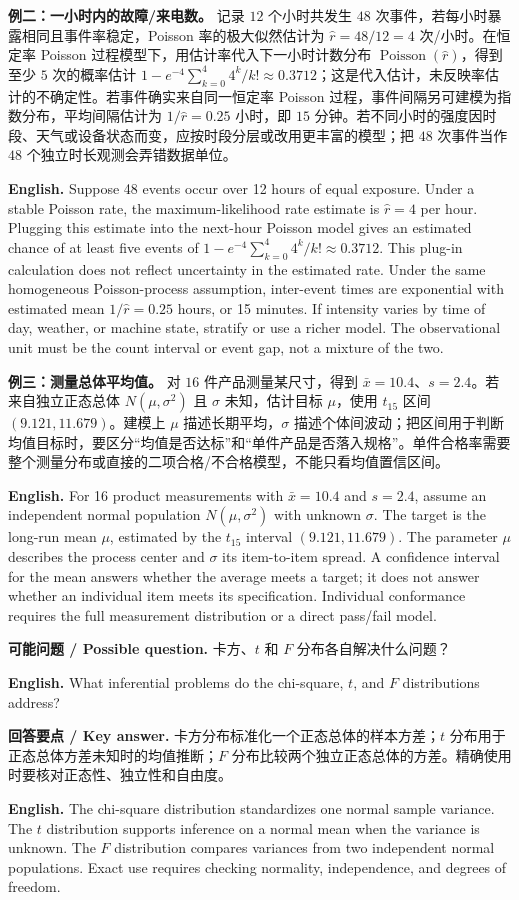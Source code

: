 \documentclass[UTF8,11pt,a4paper]{ctexart}
\newcommand{\EN}[1]{\par\noindent\textbf{English.} #1\par}
\newcommand{\ASK}[4]{\par\noindent\textbf{可能问题 / Possible question.} #1\par\EN{#2}\noindent\textbf{回答要点 / Key answer.} #3\par\EN{#4}\medskip}
\begin{document}
\noindent\textbf{例二：一小时内的故障/来电数。} 记录 $12$ 个小时共发生 $48$ 次事件，若每小时暴露相同且事件率稳定，Poisson 率的极大似然估计为 $\hat r=48/12=4$ 次/小时。在恒定率 Poisson 过程模型下，用估计率代入下一小时计数分布 $\operatorname{Poisson}(\hat r)$，得到至少 $5$ 次的概率估计 $1-e^{-4}\sum_{k=0}^4 4^k/k!\approx0.3712$；这是代入估计，未反映率估计的不确定性。若事件确实来自同一恒定率 Poisson 过程，事件间隔另可建模为指数分布，平均间隔估计为 $1/\hat r=0.25$ 小时，即 $15$ 分钟。若不同小时的强度因时段、天气或设备状态而变，应按时段分层或改用更丰富的模型；把 $48$ 次事件当作 $48$ 个独立时长观测会弄错数据单位。
\EN{Suppose 48 events occur over 12 hours of equal exposure. Under a stable Poisson rate, the maximum-likelihood rate estimate is $\hat r=4$ per hour. Plugging this estimate into the next-hour Poisson model gives an estimated chance of at least five events of $1-e^{-4}\sum_{k=0}^4 4^k/k!\approx0.3712$. This plug-in calculation does not reflect uncertainty in the estimated rate. Under the same homogeneous Poisson-process assumption, inter-event times are exponential with estimated mean $1/\hat r=0.25$ hours, or 15 minutes. If intensity varies by time of day, weather, or machine state, stratify or use a richer model. The observational unit must be the count interval or event gap, not a mixture of the two.}

\noindent\textbf{例三：测量总体平均值。} 对 $16$ 件产品测量某尺寸，得到 $\bar x=10.4$、$s=2.4$。若来自独立正态总体 $N(\mu,\sigma^2)$ 且 $\sigma$ 未知，估计目标 $\mu$，使用 $t_{15}$ 区间 $(9.121,11.679)$。建模上 $\mu$ 描述长期平均，$\sigma$ 描述个体间波动；把区间用于判断均值目标时，要区分“均值是否达标”和“单件产品是否落入规格”。单件合格率需要整个测量分布或直接的二项合格/不合格模型，不能只看均值置信区间。
\EN{For 16 product measurements with $\bar x=10.4$ and $s=2.4$, assume an independent normal population $N(\mu,\sigma^2)$ with unknown $\sigma$. The target is the long-run mean $\mu$, estimated by the $t_{15}$ interval $(9.121,11.679)$. The parameter $\mu$ describes the process center and $\sigma$ its item-to-item spread. A confidence interval for the mean answers whether the average meets a target; it does not answer whether an individual item meets its specification. Individual conformance requires the full measurement distribution or a direct pass/fail model.}

\ASK{卡方、$t$ 和 $F$ 分布各自解决什么问题？}{What inferential problems do the chi-square, $t$, and $F$ distributions address?}{卡方分布标准化一个正态总体的样本方差；$t$ 分布用于正态总体方差未知时的均值推断；$F$ 分布比较两个独立正态总体的方差。精确使用时要核对正态性、独立性和自由度。}{The chi-square distribution standardizes one normal sample variance. The $t$ distribution supports inference on a normal mean when the variance is unknown. The $F$ distribution compares variances from two independent normal populations. Exact use requires checking normality, independence, and degrees of freedom.}
\end{document}
